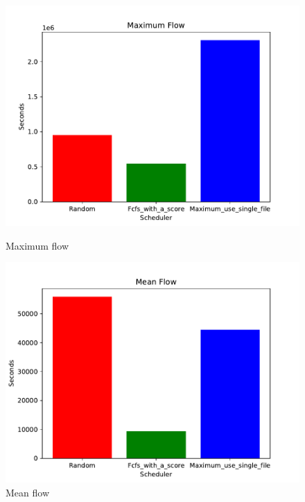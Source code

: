 \documentclass[a4paper]{article}
\begin{document}
\begin{figure}[H] 
  \label{ fig7} 
  \begin{minipage}[b]{0.5\linewidth}
    \centering
    \includegraphics[width=1.11\linewidth]{MBSS/plot/2021-05-23_Maximum_flow.pdf} 
    \caption{Maximum flow} 
    \vspace{4ex}
  \end{minipage}%
  \begin{minipage}[b]{0.5\linewidth}
    \centering
    \includegraphics[width=1.11\linewidth]{MBSS/plot/2021-05-23_Mean_flow.pdf} 
    \caption{Mean flow} 
    \vspace{4ex}
  \end{minipage} 
  \begin{minipage}[b]{0.5\linewidth}

\end{minipage}
\end{figure}
\end{document}
